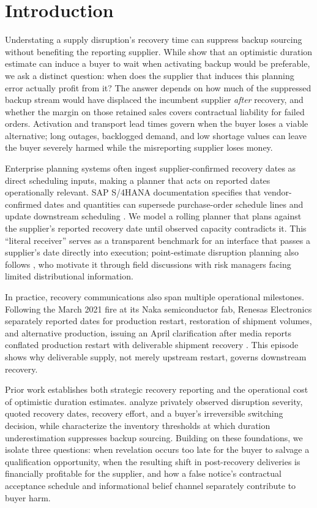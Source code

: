 \documentclass[preprint,11pt,authoryear]{elsarticle}
\newcommand{\claim}[1]{} %
\begin{document}
\section{Introduction}\label{sec:intro}
\claim{I1}Understating a supply disruption's recovery time can suppress backup sourcing without benefiting the reporting supplier. While \citet{jin2026} show that an optimistic duration estimate can induce a buyer to wait when activating backup would be preferable, we ask a distinct question: when does the supplier that induces this planning error actually profit from it? The answer depends on how much of the suppressed backup stream would have displaced the incumbent supplier \emph{after} recovery, and whether the margin on those retained sales covers contractual liability for failed orders. Activation and transport lead times govern when the buyer loses a viable alternative; long outages, backlogged demand, and low shortage values can leave the buyer severely harmed while the misreporting supplier loses money.

\claim{I2}Enterprise planning systems often ingest supplier-confirmed recovery dates as direct scheduling inputs, making a planner that acts on reported dates operationally relevant. SAP S/4HANA documentation specifies that vendor-confirmed dates and quantities can supersede purchase-order schedule lines and update downstream scheduling \citep{sapVendorConfirmation,sapScheduling}. We model a rolling planner that plans against the supplier's reported recovery date until observed capacity contradicts it. This ``literal receiver'' serves as a transparent benchmark for an interface that passes a supplier's date directly into execution; point-estimate disruption planning also follows \citet{jin2026}, who motivate it through field discussions with risk managers facing limited distributional information.

\claim{I3}In practice, recovery communications also span multiple operational milestones. Following the March 2021 fire at its Naka semiconductor fab, Renesas Electronics separately reported dates for production restart, restoration of shipment volumes, and alternative production, issuing an April clarification after media reports conflated production restart with deliverable shipment recovery \citep{renesas2021Update4,renesas2021Clarification,renesas2021Update6}. This episode shows why deliverable supply, not merely upstream restart, governs downstream recovery.

\claim{I4}Prior work establishes both strategic recovery reporting and the operational cost of optimistic duration estimates. \citet{yangMurthy2014} analyze privately observed disruption severity, quoted recovery dates, recovery effort, and a buyer's irreversible switching decision, while \citet{jin2026} characterize the inventory thresholds at which duration underestimation suppresses backup sourcing. Building on these foundations, we isolate three questions: when revelation occurs too late for the buyer to salvage a qualification opportunity, when the resulting shift in post-recovery deliveries is financially profitable for the supplier, and how a false notice's contractual acceptance schedule and informational belief channel separately contribute to buyer harm.
\end{document}
